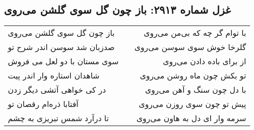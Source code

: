 \begin{center}
\section*{غزل شماره ۲۹۱۳: باز چون گل سوی گلشن می‌روی}
\label{sec:2913}
\begin{longtable}{l p{0.5cm} r}
باز چون گل سوی گلشن می‌روی
&&
با توام گر چه که بی‌من می‌روی
\\
صدزبان شد سوسن اندر شرح تو
&&
گلرخا خوش سوی سوسن می‌روی
\\
سوی مستان با دو لعل می فروش
&&
از برای باده دادن می‌روی
\\
شاهدان استاره وار اندر پیت
&&
تو بکش چون ماه روشن می‌روی
\\
در کی خواهی آتشی دیگر زدن
&&
با دل چون سنگ و آهن می‌روی
\\
آفتابا ذره‌ام رقصان تو
&&
پیش تو چون سوی روزن می‌روی
\\
تا درآرد شمس تبریزی به چشم
&&
سرمه وار ای دل به هاون می‌روی
\\
\end{longtable}
\end{center}
